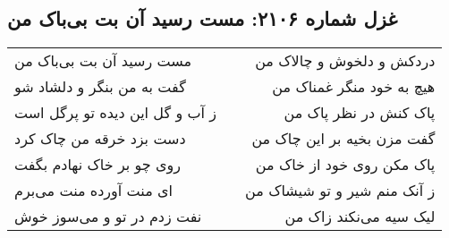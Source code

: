\begin{center}
\section*{غزل شماره ۲۱۰۶: مست رسید آن بت بی‌باک من}
\label{sec:2106}
\begin{longtable}{l p{0.5cm} r}
مست رسید آن بت بی‌باک من
&&
دردکش و دلخوش و چالاک من
\\
گفت به من بنگر و دلشاد شو
&&
هیچ به خود منگر غمناک من
\\
ز آب و گل این دیده تو پرگل است
&&
پاک کنش در نظر پاک من
\\
دست بزد خرقه من چاک کرد
&&
گفت مزن بخیه بر این چاک من
\\
روی چو بر خاک نهادم بگفت
&&
پاک مکن روی خود از خاک من
\\
ای منت آورده منت می‌برم
&&
ز آنک منم شیر و تو شیشاک من
\\
نفت زدم در تو و می‌سوز خوش
&&
لیک سیه می‌نکند زاک من
\\
\end{longtable}
\end{center}
